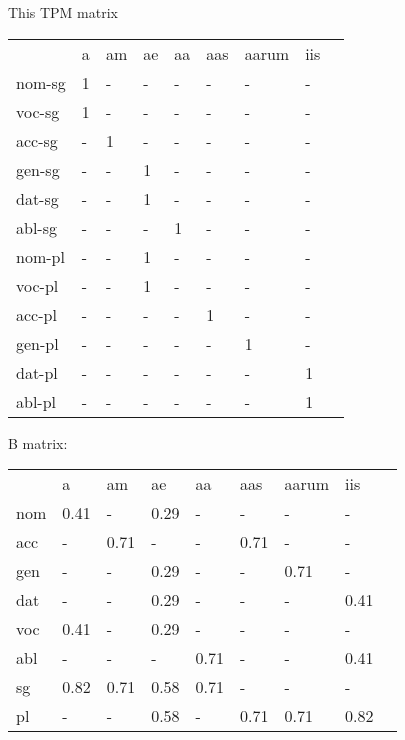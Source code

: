 \documentclass{article}
\begin{document}
 This TPM matrix  

\begin{tabular}{lllllllll}\toprule
                &a       &am      &ae      &aa      &aas     &aarum   &iis     \\ 
nom-sg     &     1  &    -   &    -   &    -   &    -   &    -   &    -   \\ 
voc-sg     &     1  &    -   &    -   &    -   &    -   &    -   &    -   \\ 
acc-sg     &    -   &     1  &    -   &    -   &    -   &    -   &    -   \\ 
gen-sg     &    -   &    -   &     1  &    -   &    -   &    -   &    -   \\ 
dat-sg     &    -   &    -   &     1  &    -   &    -   &    -   &    -   \\ 
abl-sg     &    -   &    -   &    -   &     1  &    -   &    -   &    -   \\ 
nom-pl     &    -   &    -   &     1  &    -   &    -   &    -   &    -   \\ 
voc-pl     &    -   &    -   &     1  &    -   &    -   &    -   &    -   \\ 
acc-pl     &    -   &    -   &    -   &    -   &     1  &    -   &    -   \\ 
gen-pl     &    -   &    -   &    -   &    -   &    -   &     1  &    -   \\ 
dat-pl     &    -   &    -   &    -   &    -   &    -   &    -   &     1  \\ 
abl-pl     &    -   &    -   &    -   &    -   &    -   &    -   &     1  \\ 
\end{tabular}


B matrix:

\begin{tabular}{lllllllll}\toprule
                  &a       &am      &ae      &aa      &aas     &aarum   &iis     \\ 
nom            &  0.41  &    -   &  0.29  &    -   &    -   &    -   &    -   \\ 
acc            &    -   &  0.71  &    -   &    -   &  0.71  &    -   &    -   \\ 
gen            &    -   &    -   &  0.29  &    -   &    -   &  0.71  &    -   \\ 
dat            &    -   &    -   &  0.29  &    -   &    -   &    -   &  0.41  \\ 
voc            &  0.41  &    -   &  0.29  &    -   &    -   &    -   &    -   \\ 
abl            &    -   &    -   &    -   &  0.71  &    -   &    -   &  0.41  \\ 
sg             &  0.82  &  0.71  &  0.58  &  0.71  &    -   &    -   &    -   \\ 
pl             &    -   &    -   &  0.58  &    -   &  0.71  &  0.71  &  0.82  \\ 
\end{tabular}
\end{document}
